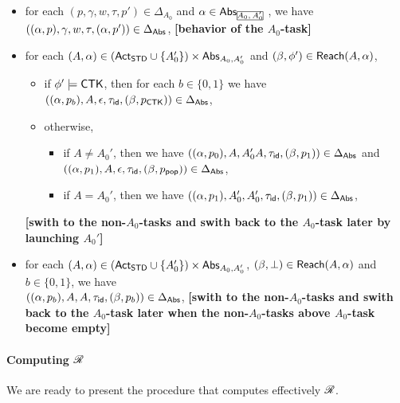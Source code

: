 \begin{itemize}
    \item for each $(p,\gamma,w,\tau,p')\in\Delta_{A_0}$ and $\alpha\in\abs_{\mhcancel{A_0,A_0'}}$, we have $((\alpha,p),\gamma,w,\tau,(\alpha,p'))\in\Delta_{{\mathsf{Abs} }}$, \textbf{[behavior of the $A_0$-task]}
    \item for each $(A,\alpha)\in({\sf Act}_{{\sf STD}}\cup\{A_0'\})\times{\mathsf{Abs} }_{A_0,A_0'}$ and $(\beta,\phi')\in{\sf Reach}(A,\alpha)$, 
        \begin{itemize}
            \item if $\phi' \models {\sf CTK}$, then for each $b \in \{0,1\}$ we have $((\alpha,p_b),A,\epsilon,\tau_{\mathsf{id}},(\beta,p_{{\sf CTK}}))\in\Delta_{{\mathsf{Abs} }}$,
            \item otherwise,
            \begin{itemize}
                \item if $A\neq A_0'$, then we have
                    $((\alpha,p_0),A,A_0'A,\tau_{\mathsf{id}},(\beta,p_1))\in\Delta_{{\mathsf{Abs} }}$ and $((\alpha,p_1),A,\epsilon,\tau_{\mathsf{id}},(\beta,p_{\mathsf{pop}}))\in\Delta_{{\mathsf{Abs} }}$,
                \item if $A=A_0'$, then we have $((\alpha,p_1),A_0',A_0',\tau_{\mathsf{id}},(\beta,p_1))\in\Delta_{{\mathsf{Abs} }}$,
            \end{itemize}
        \end{itemize}
                \textbf{[swith to the non-$A_0$-tasks and swith back to the $A_0$-task later by launching $A_0'$]}
    \item for each $(A,\alpha)\in({\sf Act}_{{\sf STD}}\cup\{A_0'\})\times{\mathsf{Abs} }_{A_0,A_0'}$, $(\beta,\bot)\in{\sf Reach}(A,\alpha)$ and $b\in\{0,1\}$, we have \\
        $((\alpha,p_b),A,A,\tau_{\mathsf{id}},(\beta,p_b))\in\Delta_{{\mathsf{Abs} }}$,
            \textbf{[swith to the non-$A_0$-tasks and swith back to the $A_0$-task later when the non-$A_0$-tasks above $A_0$-task become empty]}
\end{itemize}

\paragraph{Computing $\mathscr{R}$} We are ready to present the procedure that computes effectively $\mathscr{R}$.

